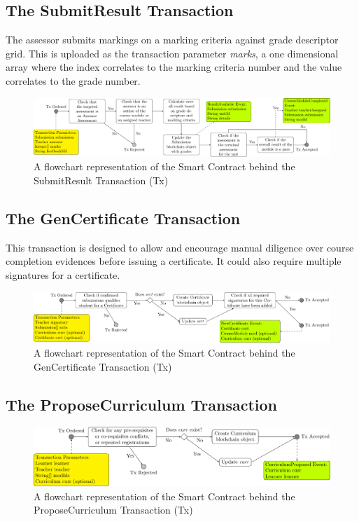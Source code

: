 \subsection{The SubmitResult Transaction}

The assessor submits markings on a marking criteria against grade descriptor grid. This is uploaded as the transaction 
parameter \textit{marks}, a one dimensional array where the index correlates to the marking criteria number and 
the value correlates to the grade number.

\begin{figure}[!ht]
    \centering
    \includegraphics[width=1.0\textwidth]{srtx}    
    \caption{A flowchart representation of the Smart Contract behind the SubmitResult Transaction (Tx)} \label{fig:srtx}
\end{figure}

\subsection{The GenCertificate Transaction}

This transaction is designed to allow and encourage manual diligence over course completion evidences before issuing a certificate. 
It could also require multiple signatures for a certificate.

\begin{figure}[!ht]
    \centering
    \includegraphics[width=1.0\textwidth]{gctx}    
    \caption{A flowchart representation of the Smart Contract behind the GenCertificate Transaction (Tx)} \label{fig:gctx}
\end{figure}

\subsection{The ProposeCurriculum Transaction}

\begin{figure}[!ht]
    \centering
    \includegraphics[width=1.0\textwidth]{pctx}    
    \caption{A flowchart representation of the Smart Contract behind the ProposeCurriculum Transaction (Tx)} \label{fig:pctx}
\end{figure}

